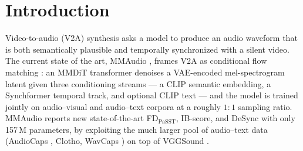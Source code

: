 \section{Introduction}
\label{sec:intro}

Video-to-audio (V2A) synthesis asks a model to produce an audio
waveform that is both semantically plausible and temporally
synchronized with a silent video. The current state of the art,
MMAudio \citep{cheng2024mmaudio}, frames V2A as conditional flow
matching \citep{lipman2022flow}: an MMDiT
\citep{esser2024scaling} transformer denoises a VAE-encoded
mel-spectrogram latent given three conditioning streams --- a
CLIP \citep{radford2021learning} semantic embedding, a
Synchformer \citep{iashin2024synchformer} temporal track, and
optional CLIP text --- and the model is trained jointly on
audio--visual and audio--text corpora at a roughly $1{:}1$
sampling ratio. MMAudio reports new state-of-the-art
FD$_{\text{PaSST}}$, IB-score, and DeSync with only 157\,M
parameters, by exploiting the much larger pool of
audio--text data (AudioCaps \citep{kim2019audiocaps},
Clotho, WavCaps \citep{mei2024wavcaps}) on top of VGGSound
\citep{chen2024vggsound}.


